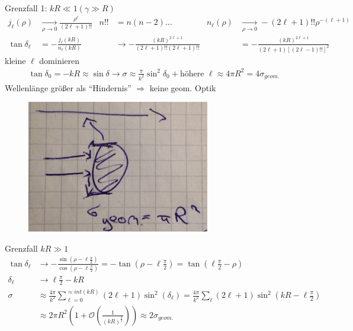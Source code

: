 	Grenzfall 1: $kR \ll 1 (\gamma \gg R)$
		\begin{align*}
			j_\ell (\rho) &\underset{\rho \rightarrow 0}{\rightarrow} \frac{\rho^\ell}{(2\ell+1)!!}
			& n!! &= n(n-2) \ldots 
			& n_\ell (\rho) &\underset{\rho \rightarrow 0}{\rightarrow}
			-(2\ell + 1) !! \rho^{-(\ell +1)} \\
			\tan \delta_\ell &= -\frac{j_\ell (kR)}{n_\ell (kR)} &
			&\rightarrow - \frac{(kR)^{2\ell+1}}{(2\ell +1)!! (2\ell+1)!!} 
			& &= -\frac{(kR)^{2 \ell +1}}{(2\ell +1) [(2 \ell -1)!!]^2}
		\end{align*}
	kleine $\ell$ dominieren
		\begin{align*}
			\tan \delta_0 = - kR \approx \sin \delta \rightarrow 
			\sigma \approx \frac{\pi}{k^2} \sin^2\delta_0 + \text{höhere } \ell 
			\approx 4 \pi R^2 = 4 \sigma_{geom.}
 		\end{align*}
	Wellenlänge größer als ``Hindernis'' $\Rightarrow$ keine geom. Optik 
	\begin{figure} [h]
		\begin{center}
			\includegraphics[width=8cm]{Annaherung_harte_Kugel1}
		\end{center}
	\end{figure}
 Grenzfall $kR \gg1$
		\begin{align*}
			\tan \delta_\ell &\rightarrow - \frac{\sin (\rho-\ell \frac{\pi}{2})}{\cos (\rho-\ell \frac{\pi}{2})} 
			= -\tan (\rho-\ell \frac{\pi}{2}) = \tan(\ell \frac{\pi}{2} - \rho) \\
			\delta_\ell &\rightarrow \ell \frac{\pi}{2}- kR\\
			\sigma &\approx \frac{4 \pi}{k^2} \sum_{\ell =0}^{\approx int(kR)}
			(2 \ell + 1) \sin^2(\delta_\ell) 
			= \frac{4\pi}{k^2} \sum_\ell (2 \ell + 1) \sin^2(kR- \ell \frac{\pi}{2}) \\
			&\approx 2 \pi R^2 (1+ \mathscr{O} \left(\frac{1}{(kR)^{\frac{2}{3}}}\right)) 			
			\approx 2 \sigma_{geom.}
		\end{align*}
